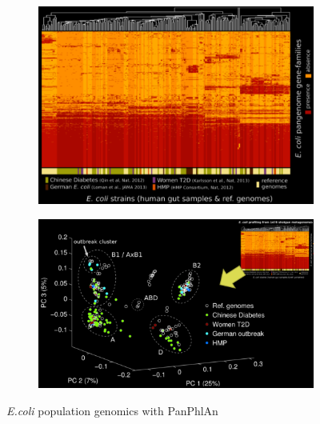             \begin{figure}[!h]
            \centering
            \begin{subfigure}{.49\textwidth}
                \centering
                \includegraphics[width=\linewidth]{Ecoli1.png}
                \caption{\label{fig:Ecoli1}}
            \end{subfigure}
            \begin{subfigure}{.49\textwidth}
                \centering
                \includegraphics[width=\linewidth]{Ecoli2.png}
                \caption{\label{fig:Ecoli2}}
            \end{subfigure}
            \caption{\emph{E.coli} population genomics with PanPhlAn}
            \end{figure}

            \vspace{2cm}

